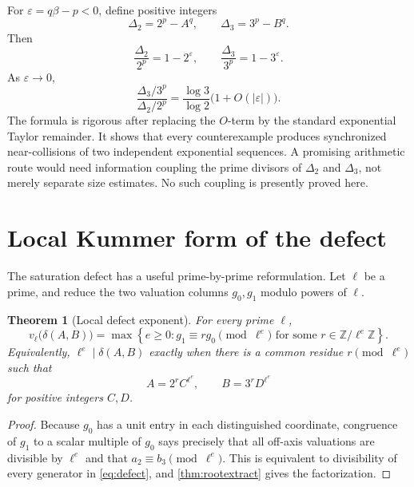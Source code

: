 \documentclass[11pt]{article}
\numberwithin{equation}{section}
\newtheorem{theorem}{Theorem}[section]
\theoremstyle{definition}
\newcommand{\Z}{\mathbb{Z}}
\newcommand{\defect}{\delta}
\begin{document}
For \(\varepsilon=q\beta-p<0\), define positive integers
\[
       \Delta_2=2^p-A^q,
       \qquad
       \Delta_3=3^p-B^q.
\]
Then
\[
 \frac{\Delta_2}{2^p}=1-2^\varepsilon,
 \qquad
 \frac{\Delta_3}{3^p}=1-3^\varepsilon.
\]
As \(\varepsilon\to0\),
\begin{equation}\label{eq:syncasymp}
 \frac{\Delta_3/3^p}{\Delta_2/2^p}
   =\frac{\log3}{\log2}\bigl(1+O(|\varepsilon|)\bigr).
\end{equation}
The formula is rigorous after replacing the \(O\)-term by the standard exponential Taylor remainder. It shows that every counterexample produces synchronized near-collisions of two independent exponential sequences. A promising arithmetic route would need information coupling the prime divisors of \(\Delta_2\) and \(\Delta_3\), not merely separate size estimates. No such coupling is presently proved here.

\section{Local Kummer form of the defect}

The saturation defect has a useful prime-by-prime reformulation. Let \(\ell\) be a prime, and reduce the two valuation columns \(g_0,g_1\) modulo powers of \(\ell\).

\begin{theorem}[Local defect exponent]\label{thm:localdefect}
For every prime \(\ell\),
\begin{equation}\label{eq:localdefect}
 v_\ell\bigl(\defect(A,B)\bigr)
 =\max\left\{e\ge0:
    g_1\equiv r g_0\pmod{\ell^e}
    \text{ for some }r\in\Z/\ell^e\Z
   \right\}.
\end{equation}
Equivalently, \(\ell^e\mid\defect(A,B)\) exactly when there is a common residue \(r\pmod{\ell^e}\) such that
\begin{equation}\label{eq:localfactor}
       A=2^r C^{\ell^e},
       \qquad
       B=3^r D^{\ell^e}
\end{equation}
for positive integers \(C,D\).
\end{theorem}

\begin{proof}
Because \(g_0\) has a unit entry in each distinguished coordinate, congruence of \(g_1\) to a scalar multiple of \(g_0\) says precisely that all off-axis valuations are divisible by \(\ell^e\) and that \(a_2\equiv b_3\pmod{\ell^e}\). This is equivalent to divisibility of every generator in \eqref{eq:defect}, and \cref{thm:rootextract} gives the factorization.
\end{proof}
\end{document}
